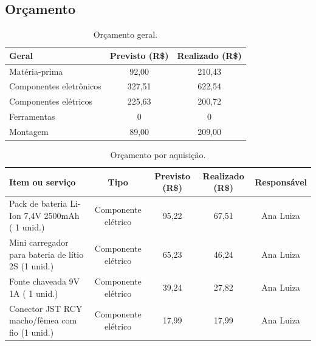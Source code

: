 \begin{landscape}

\chapter{Orçamento}
\label{orca}

\begin{table}[htpb]
\begin{center}
\caption{Orçamento geral.}
\begin{tabular}{|l|c|c|}
\hline
\textbf{Geral}          & \textbf{Previsto (R\$)} & \textbf{Realizado (R\$)} \\ \hline
Matéria-prima           & 92,00                    & 210,43                     \\ \hline
Componentes eletrônicos & 327,51                    & 622,54                     \\ \hline
Componentes elétricos   & 225,63                  &  200,72                \\ \hline
Ferramentas             & 0                    & 0                     \\ \hline
Montagem                & 89,00                    & 209,00                     \\ \hline
\end{tabular}
\end{center}
\end{table}

\newpage

\begin{table}[htpb]
\begin{center}
\caption{Orçamento por aquisição.}
\begin{tabular}{|l|c|c|c|c|}
\hline
\textbf{Item ou serviço} & \textbf{Tipo} & \textbf{Previsto (R\$)} & \textbf{Realizado (R\$)} & \textbf{Responsável} \\ \hline
Pack de bateria Li-Ion 7,4V 2500mAh ( 1 unid.)
& Componente elétrico & 95,22 & 67,51 & Ana Luiza \\ \hline

Mini carregador para bateria de lítio 2S (1 unid.)
& Componente elétrico & 65,23 & 46,24 & Ana Luiza \\ \hline

Fonte chaveada 9V 1A ( 1 unid.)
& Componente elétrico & 39,24 & 27,82 & Ana Luiza \\ \hline

Conector JST RCY macho/fêmea com fio (1 unid.)
& Componente elétrico & 17,99 & 17,99 & Ana Luiza \\ \hline


\end{tabular}
\end{center}
\end{table}
\end{landscape}

